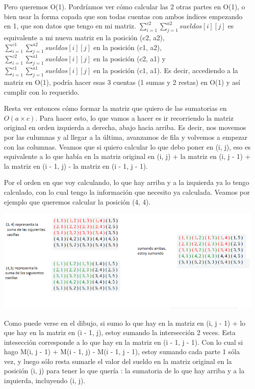 Pero queremos O(1). Pordríamos ver cómo calcular las 2 otras partes en O(1), o bien usar la forma copada que son todas cuentas con ambos índices empezando en 1, que son datos que tengo en mi matriz. $\sum_{i = 1}^{c2} \sum_{j = 1}^{a2} sueldos[i][j]$ es equivalente a mi nueva matriz en la posición (c2, a2), $\sum_{i = 1}^{c1} \sum_{j = 1}^{a2} sueldos[i][j]$ en la posición (c1, a2), $\sum_{i = 1}^{c2} \sum_{j = 1}^{a1} sueldos[i][j]$ en la posición (c2, a1) y $\sum_{i = 1}^{c1} \sum_{j = 1}^{a1} sueldos[i][j]$ en la posición (c1, a1). Es decir, accediendo a la matriz en O(1), podría hacer esas 3 cuentas (1 sumas y 2 restas) en O(1) y así cumplir con lo requerido.  \newline

Resta ver entonces cómo formar la matriz que quiero de las sumatorias en $O(a \times c)$. Para hacer esto, lo que vamos a hacer es ir recorriendo la matriz original en orden izquierda a derecha, abajo hacia arriba. Es decir, nos movemos por las culumnas y al llegar a la última, avanzamos de fila y volvemos a empezar con las columnas. Veamos que si quiero calcular lo que debo poner en (i, j), eso es equivalente a lo que había en la matriz original en (i, j) + la matriz en (i, j - 1) + la matriz en (i - 1, j) - la matriz en (i - 1, j - 1).  \newline

Por el orden en que voy calculando, lo que hay arriba y a la izquierda ya lo tengo calculado, con lo cual tengo la información que necesito ya calculada. Veamos por ejemplo que queremos calcular la posición (4, 4).

\includegraphics[scale=0.5]{img/tabla.jpg}

Como puede verse en el dibujo, si sumo lo que hay en la matriz en (i, j - 1) + lo que hay en la matriz en (i - 1, j), estoy sumando la intersección 2 veces. Esta intesección corresponde a lo que hay en la matriz en (i - 1, j - 1). Con lo cual si hago M(i, j - 1) + M(i - 1, j) - M(i - 1, j - 1), estoy sumando cada parte 1 sóla vez, y luego sólo resta sumarle el valor del sueldo en la matriz original en la posición (i, j) para tener lo que quería : la sumatoria de lo que hay arriba y a la izquierda, incluyendo (i, j). \newline

